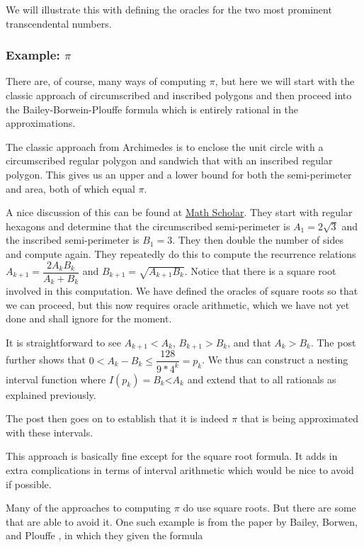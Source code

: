 \documentclass[12pt]{article}
\theoremstyle{remark}
\newcommand{\lt}{\mathord{<}}
\begin{document}
We will illustrate this with defining the oracles for the two most prominent transcendental numbers. 


\subsubsection{Example: $\pi$}

There are, of course, many ways of computing $\pi$, but here we will start with the classic approach of circumscribed and inscribed polygons and then proceed into the Bailey-Borwein-Plouffe formula which is entirely rational in the approximations. 

The classic approach from Archimedes is to enclose the unit circle with a circumscribed regular polygon and sandwich that with an inscribed regular polygon. This gives us an upper and a lower bound for both the semi-perimeter and area, both of which equal $\pi$. 

A nice discussion of this can be found at \href{https://mathscholar.org/2019/02/simple-proofs-archimedes-calculation-of-pi/}{Math Scholar}. They start with regular hexagons and determine that the circumscribed semi-perimeter is $A_1 = 2 \sqrt{3}$ and the inscribed semi-perimeter is $B_1 = 3$. They then double the number of sides and compute again. They repeatedly do this to compute the recurrence relations $A_{k+1} = \dfrac{2A_k B_k}{A_k + B_k}$ and $B_{k+1} = \sqrt{A_{k+1}B_k}$. Notice that there is a square root involved in this computation. We have defined the oracles of square roots so that we can proceed, but this now requires oracle arithmetic, which we have not yet done and shall ignore for the moment.  

It is straightforward to see $A_{k+1} < A_k$, $B_{k+1} > B_k$, and that $A_k > B_k$. The post further shows that $0 < A_k - B_k \leq \dfrac{128}{9*4^k} = p_k $. We thus can construct a nesting interval function where $I(p_k) = B_k\lt A_k$ and extend that to all rationals as explained previously. 

The post then goes on to establish that it is indeed $\pi$ that is being approximated with these intervals.

This approach is basically fine except for the square root formula. It adds in extra complications in terms of interval arithmetic which would be nice to avoid if possible. 

Many of the approaches to computing $\pi$ do use square roots. But there are some that are able to avoid it. One such example is from the paper by Bailey, Borwen, and Plouffe \cite{BBP}, in which they given the formula 
\end{document}
